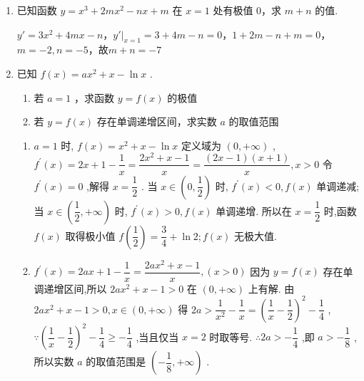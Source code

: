 \begin{enumerate}
    \item 已知函数 $y = {x}^{3} + {2m}{x}^{2} - {nx} + m$ 在 $x = 1$ 处有极值 0，求 $m + n$ 的值.
    \begin{jieda}
        $y' = 3x^2+4mx-n$，$y'|_{x = 1} = 3+4m-n = 0$，$1+2m-n+m = 0$，$m = -2, n = -5$，故$m+n = -7$
    \end{jieda}
    
    \item 已知 $f\left( x\right)  = a{x}^{2} + x - \ln x$ .
    \begin{enumerate}
        \item 若 $a = 1$ ，求函数 $y = f\left( x\right)$ 的极值
        \item 若 $y = f\left( x\right)$ 存在单调递增区间，求实数 $a$ 的取值范围
    \end{enumerate}
    \begin{jieda}
        \begin{enumerate}
            \item $a = 1$ 时, $f\left( x\right)  = {x}^{2} + x - \ln x$ 定义域为 $\left( {0, + \infty }\right)$ ,
            ${f}^{\prime }\left( x\right)  = {2x} + 1 - \dfrac{1}{x} = \dfrac{2{x}^{2} + x - 1}{x} = \dfrac{\left( {{2x} - 1}\right) \left( {x + 1}\right) }{x},x > 0$
            令 ${f}^{\prime }\left( x\right)  = 0$ ,解得 $x = \dfrac{1}{2}$ .
            当 $x \in  \left( {0,\dfrac{1}{2}}\right)$ 时, ${f}^{\prime }\left( x\right)  < 0,f\left( x\right)$ 单调递减;
            当 $x \in  \left( {\dfrac{1}{2}, + \infty }\right)$ 时, ${f}^{\prime }\left( x\right)  > 0,f\left( x\right)$ 单调递增.
            所以在 $x = \dfrac{1}{2}$ 时,函数 $f\left( x\right)$ 取得极小值 $f\left( \dfrac{1}{2}\right)  = \dfrac{3}{4} + \ln 2;f\left( x\right)$ 无极大值.
            \item ${f}^{\prime }\left( x\right)  = {2ax} + 1 - \dfrac{1}{x} = \dfrac{{2a}{x}^{2} + x - 1}{x},\left( {x > 0}\right)$
            因为 $y = f\left( x\right)$ 存在单调递增区间,所以 ${2a}{x}^{2} + x - 1 > 0$ 在 $\left( {0, + \infty }\right)$ 上有解.
            由 ${2a}{x}^{2} + x - 1 > 0,x \in  \left( {0, + \infty }\right)$ 得 ${2a} > \dfrac{1}{{x}^{2}} - \dfrac{1}{x} = {\left( \dfrac{1}{x} - \dfrac{1}{2}\right) }^{2} - \dfrac{1}{4}$ ,
            $\because {\left( \dfrac{1}{x} - \dfrac{1}{2}\right) }^{2} - \dfrac{1}{4} \geq   - \dfrac{1}{4}$ ,当且仅当 $x = 2$ 时取等号.
            $\therefore {2a} >  - \dfrac{1}{4}$ ,即 $a >  - \dfrac{1}{8}$ ,
            所以实数 $a$ 的取值范围是 $\left( {-\dfrac{1}{8}, + \infty }\right)$ .
        \end{enumerate}

\end{jieda}
\end{enumerate}
